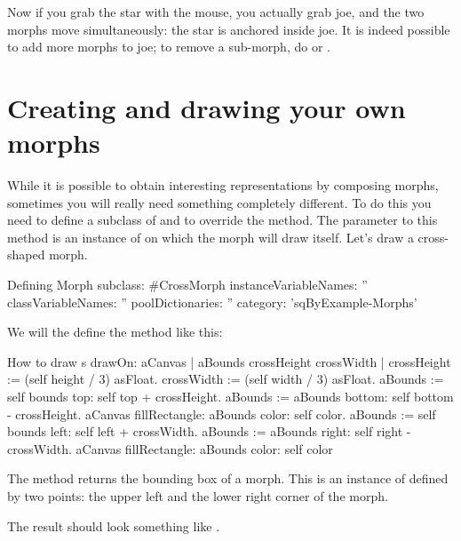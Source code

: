 \documentclass[a4paper,10pt,twoside]{book}
\begin{document}
Now if you grab the star with the mouse, you actually grab joe, and the two morphs move simultaneously: the star is anchored inside joe.
It is indeed possible to add more morphs to joe; to remove a sub-morph, do    or  .


\section{Creating and drawing your own morphs}

While it is possible to obtain interesting representations by composing morphs, sometimes you will really need something completely different.
To do this you need to define a subclass of  and to override the  method.
The parameter to this method is an instance of  on which the morph will draw itself.
Let's draw a cross-shaped morph.

\begin{classdef}{Defining }
Morph subclass: #CrossMorph
   instanceVariableNames: ''
   classVariableNames: ''
   poolDictionaries: ''
   category: 'sqByExample-Morphs'
\end{classdef}

We will the define the  method like this:
\begin{method}{How to draw s}
drawOn: aCanvas
   | aBounds crossHeight crossWidth |
   crossHeight := (self height / 3) asFloat.
   crossWidth := (self width / 3) asFloat.
   aBounds := self bounds top: self top + crossHeight.
   aBounds := aBounds bottom: self bottom - crossHeight.
   aCanvas fillRectangle: aBounds color: self color.
   aBounds := self bounds left: self left + crossWidth.
   aBounds := aBounds right: self right - crossWidth.
   aCanvas fillRectangle: aBounds color: self color
\end{method}

The  method returns the bounding box of a morph. This is an instance of  defined by two points: the upper left and the lower right corner of the morph.

The result should look something like .
\end{document}
